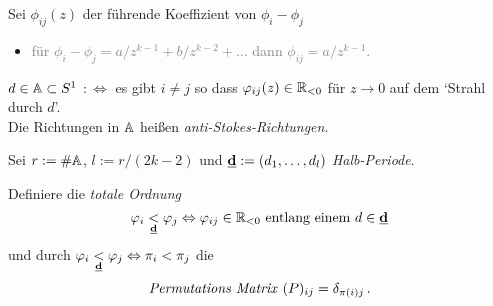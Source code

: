 \begin{defn}
  Sei $\phi_{ij}(z)$ der führende Koeffizient von $\phi_i-\phi_j$
  \begin{itemize}
    \item \textcolor{gray}{für $\phi_i-\phi_j=a/z^{k-1}+b/z^{k-2}+\dots$ dann
      $\phi_{ij}=a/z^{k-1}$.}
  \end{itemize}
  $d\in\A\subset S^1$
  $:\Leftrightarrow{}$
  es gibt $i\neq j$ so dass $\phi_{ij}(z)\in\R_{<0}$ für $z\to0$ auf dem
  `Strahl durch $d$'.
  \\Die Richtungen in $\A$ heißen \emph{anti-Stokes-Richtungen}.
\end{defn}
\begin{paracol}{2}
\switchcolumn[0]
  Sei $r:=\#\A$, $l:=r/(2k-2)$ und $\textbf{\underline{d}}:=(d_1,\dots,d_l)$
  \emph{Halb-Periode}.
  \begin{defn}
    Definiere die \emph{totale Ordnung}
    \[
      \phi_i\underset{\textbf{\underline{d}}}{<}\phi_j
      \Leftrightarrow{}
      \phi_{ij}\in\R_{<0}\text{
      entlang einem } d\in\textbf{\underline{d}}
    \]
    und durch $\phi_i\underset{\textbf{\underline{d}}}{<}\phi_j
    \Leftrightarrow{}\pi_i<\pi_j$ die
    \[
      \text{\emph{Permutations Matrix} } (P)_{ij}=\delta_{\pi(i)j} \,.
    \]
  \end{defn}
\switchcolumn[1]
  \begin{center}
\end{center}
\end{paracol}
